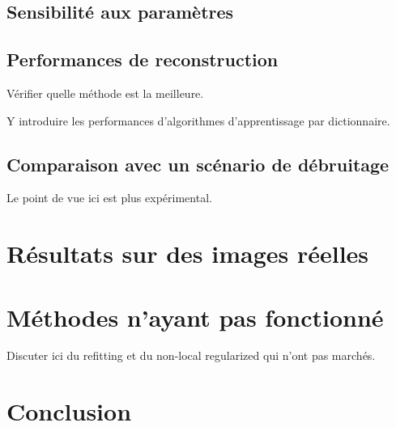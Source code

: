 \documentclass[a4paper, twoside, table, justified,
               nofonts, nobib, nohyper, 10pt, french]{tufte-book}
\begin{document}
\subsection{Sensibilité aux paramètres}

\subsection{Performances de reconstruction}
Vérifier quelle méthode est la meilleure.

Y introduire les performances d'algorithmes d'apprentissage par dictionnaire.

\subsection{Comparaison avec un scénario de débruitage}
Le point de vue ici est plus expérimental.

%
\section{Résultats sur des images réelles}

%
\section{Méthodes n'ayant pas fonctionné}
Discuter ici du refitting et du non-local regularized qui n'ont pas marchés.

%
\section{Conclusion}


\backmatter





\begin{fullwidth}
	
	
\end{fullwidth}



\begin{fullwidth}
    \printindex
\end{fullwidth}
\end{document}
